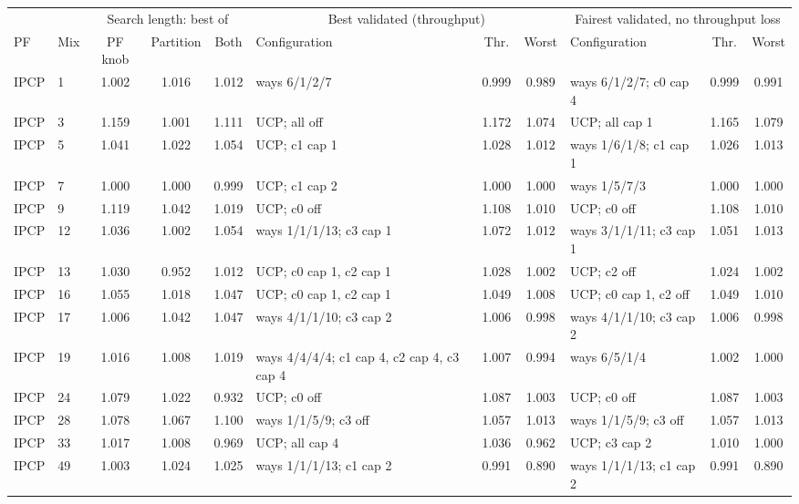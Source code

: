 \begin{tabular}{llccclcclcc}
\toprule
 & & \multicolumn{3}{c}{Search length: best of} & \multicolumn{3}{c}{Best validated (throughput)} & \multicolumn{3}{c}{Fairest validated, no throughput loss} \\
\cmidrule(lr){3-5}\cmidrule(lr){6-8}\cmidrule(lr){9-11}
PF & Mix & PF knob & Partition & Both & Configuration & Thr. & Worst & Configuration & Thr. & Worst \\
\midrule
IPCP & 1 & 1.002 & 1.016 & 1.012 & ways 6/1/2/7 & 0.999 & 0.989 & ways 6/1/2/7; c0 cap 4 & 0.999 & 0.991 \\
IPCP & 3 & 1.159 & 1.001 & 1.111 & UCP; all off & 1.172 & 1.074 & UCP; all cap 1 & 1.165 & 1.079 \\
IPCP & 5 & 1.041 & 1.022 & 1.054 & UCP; c1 cap 1 & 1.028 & 1.012 & ways 1/6/1/8; c1 cap 1 & 1.026 & 1.013 \\
IPCP & 7 & 1.000 & 1.000 & 0.999 & UCP; c1 cap 2 & 1.000 & 1.000 & ways 1/5/7/3 & 1.000 & 1.000 \\
IPCP & 9 & 1.119 & 1.042 & 1.019 & UCP; c0 off & 1.108 & 1.010 & UCP; c0 off & 1.108 & 1.010 \\
IPCP & 12 & 1.036 & 1.002 & 1.054 & ways 1/1/1/13; c3 cap 1 & 1.072 & 1.012 & ways 3/1/1/11; c3 cap 1 & 1.051 & 1.013 \\
IPCP & 13 & 1.030 & 0.952 & 1.012 & UCP; c0 cap 1, c2 cap 1 & 1.028 & 1.002 & UCP; c2 off & 1.024 & 1.002 \\
IPCP & 16 & 1.055 & 1.018 & 1.047 & UCP; c0 cap 1, c2 cap 1 & 1.049 & 1.008 & UCP; c0 cap 1, c2 off & 1.049 & 1.010 \\
IPCP & 17 & 1.006 & 1.042 & 1.047 & ways 4/1/1/10; c3 cap 2 & 1.006 & 0.998 & ways 4/1/1/10; c3 cap 2 & 1.006 & 0.998 \\
IPCP & 19 & 1.016 & 1.008 & 1.019 & ways 4/4/4/4; c1 cap 4, c2 cap 4, c3 cap 4 & 1.007 & 0.994 & ways 6/5/1/4 & 1.002 & 1.000 \\
IPCP & 24 & 1.079 & 1.022 & 0.932 & UCP; c0 off & 1.087 & 1.003 & UCP; c0 off & 1.087 & 1.003 \\
IPCP & 28 & 1.078 & 1.067 & 1.100 & ways 1/1/5/9; c3 off & 1.057 & 1.013 & ways 1/1/5/9; c3 off & 1.057 & 1.013 \\
IPCP & 33 & 1.017 & 1.008 & 0.969 & UCP; all cap 4 & 1.036 & 0.962 & UCP; c3 cap 2 & 1.010 & 1.000 \\
IPCP & 49 & 1.003 & 1.024 & 1.025 & ways 1/1/1/13; c1 cap 2 & 0.991 & 0.890 & ways 1/1/1/13; c1 cap 2 & 0.991 & 0.890 \\
\midrule

\end{tabular}
